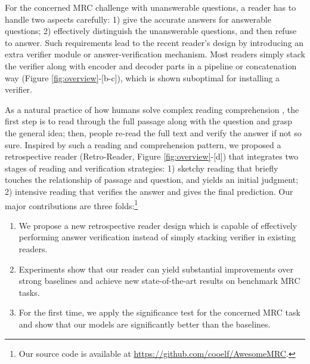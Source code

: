 \documentclass[letterpaper]{article} \usepackage{aaai21}  \usepackage{times}  \usepackage{helvet} \usepackage{courier}  \usepackage[hyphens]{url}  \usepackage{graphicx}
\begin{document}
For the concerned MRC challenge with unanswerable questions, a reader has to handle two aspects carefully: 1) give the accurate answers for answerable questions; 2) effectively distinguish the unanswerable questions, and then refuse to answer. Such requirements lead to the recent reader's design by introducing an extra verifier module or answer-verification mechanism. Most readers simply stack the verifier along with encoder and decoder parts in a pipeline or concatenation way (Figure \ref{fig:overview}-[b-c]), which is shown suboptimal for installing a verifier.

As a natural practice of how humans solve complex reading comprehension \cite{DBLP:conf/sigir/ZhengMLYZM19,doi:10.1080/00461520.1987.9653053}, the first step is to read through the full passage along with the question and grasp the general idea; then, people re-read the full text and verify the answer if not so sure. Inspired by such a reading and comprehension pattern, we proposed a retrospective reader (Retro-Reader, Figure \ref{fig:overview}-[d]) that integrates two stages of reading and verification strategies: 1) sketchy reading that briefly touches the relationship of passage and question, and yields an initial judgment; 2) intensive reading that verifies the answer and gives the final prediction. Our major contributions are three folds:\footnote{Our source code is available at \url{https://github.com/cooelf/AwesomeMRC}.}

\begin{enumerate}
\item We propose a new retrospective reader design which is capable of effectively performing answer verification instead of simply stacking verifier in existing readers.
	\item Experiments show that our reader can yield substantial improvements over strong baselines and achieve new state-of-the-art results on benchmark MRC tasks.
	\item For the first time, we apply the significance test for the concerned MRC task and show that our models are significantly better than the baselines.
\end{enumerate}
\end{document}
